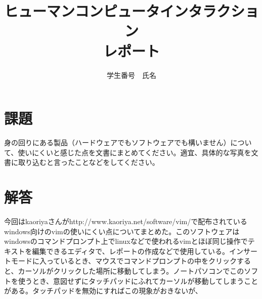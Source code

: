 \documentclass[a4paper]{jarticle}
\title{ヒューマンコンピュータインタラクション\\レポート}
\author{学生番号　氏名}
\begin{document}
\maketitle
\section{課題}
身の回りにある製品（ハードウェアでもソフトウェアでも構いません）について、使いにくいと感じた点を文書にまとめてください。適宜、具体的な写真を文書に取り込むと言ったことなどをしてください。
\section{解答}
今回はkaoriyaさんがhttp://www.kaoriya.net/software/vim/で配布されているwindows向けのvimの使いにくい点についてまとめた。このソフトウェアはwindowsのコマンドプロンプト上でlinuxなどで使われるvimとほぼ同じ操作でテキストを編集できるエディタで、レポートの作成などで使用している。インサートモードに入っているとき、マウスでコマンドプロンプトの中をクリックすると、カーソルがクリックした場所に移動してしまう。ノートパソコンでこのソフトを使うとき、意図せずにタッチパッドにふれてカーソルが移動してしまうことがある。タッチパッドを無効にすればこの現象がおきないが、
\end{document}
